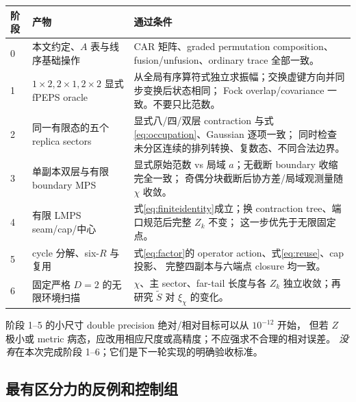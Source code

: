 \documentclass[11pt]{article}
\newcommand{\tS}{\widetilde S}
\begin{document}
\begin{longtable}{p{}p{}p{}}
\toprule
阶段 & 产物 & 通过条件\\\midrule\endhead
0 & 本文约定、$A$ 表与线序基础操作
& CAR 矩阵、graded permutation composition、fusion/unfusion、ordinary trace 全部一致。\\
1 & $1\times2,2\times1,2\times2$ 显式 fPEPS oracle
& 从全局有序算符式独立求振幅；交换虚键方向并同步变换后状态相同；
Fock overlap/covariance 一致。不要只比范数。\\
2 & 同一有限态的五个 replica sectors
& 显式八/四/双层 contraction 与式\eqref{eq:occupation}、Gaussian 逐项一致；
同时检查未分区连续的排列转换、复数态、不同合法边界。\\
3 & 单副本双层与有限 boundary MPS
& 显式原始范数 vs 局域 $a$；无截断 boundary 收缩完全一致；
奇偶分块截断后协方差/局域观测量随 $\chi$ 收敛。\\
4 & 有限 LMPS seam/cap/中心
& 式\eqref{eq:finiteidentity}成立；换 contraction tree、端口规范后完整 $Z_k$ 不变；
这一步优先于无限固定点。\\
5 & cycle 分解、six-$R$ 与复用
& 式\eqref{eq:factor}的 operator action、式\eqref{eq:reuse}、cap 投影、
完整四副本与六端点 closure 均一致。\\
6 & 固定严格 $D=2$ 的无限环境扫描
& $\chi$、主 sector、far-tail 长度与各 $Z_k$ 独立收敛；再研究 $\tS$ 对 $\xi_\chi$ 的变化。\\\bottomrule
\end{longtable}

阶段 1--5 的小尺寸 double precision 绝对/相对目标可以从 $10^{-12}$ 开始，
但若 $Z$ 极小或 metric 病态，应改用相应尺度或高精度；不应强求不合理的相对误差。
\emph{没有}在本次完成阶段 1--6；它们是下一轮实现的明确验收标准。

\subsection{最有区分力的反例和控制组}
\end{document}

